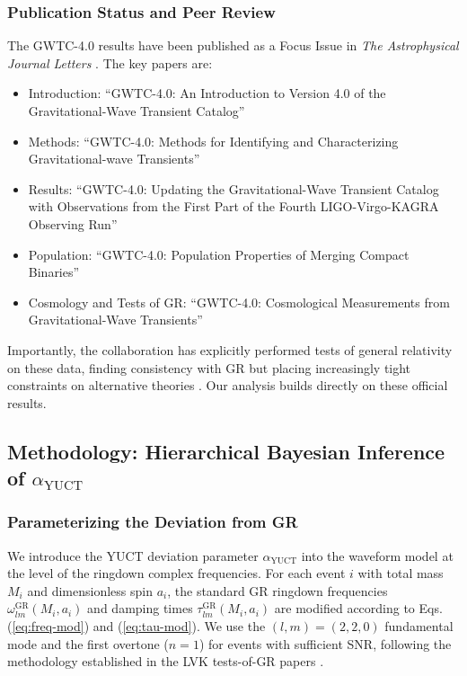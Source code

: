 \documentclass[12pt,a4paper]{article}
\theoremstyle{remark}
\begin{document}
	\subsubsection{Publication Status and Peer Review}
	
	The GWTC-4.0 results have been published as a Focus Issue in \textit{The Astrophysical Journal Letters} . The key papers are:
	
	\begin{itemize}
		\item Introduction: ``GWTC-4.0: An Introduction to Version 4.0 of the Gravitational-Wave Transient Catalog'' 
		\item Methods: ``GWTC-4.0: Methods for Identifying and Characterizing Gravitational-wave Transients'' 
		\item Results: ``GWTC-4.0: Updating the Gravitational-Wave Transient Catalog with Observations from the First Part of the Fourth LIGO-Virgo-KAGRA Observing Run'' 
		\item Population: ``GWTC-4.0: Population Properties of Merging Compact Binaries'' 
		\item Cosmology and Tests of GR: ``GWTC-4.0: Cosmological Measurements from Gravitational-Wave Transients'' 
	\end{itemize}
	
	Importantly, the collaboration has explicitly performed tests of general relativity on these data, finding consistency with GR but placing increasingly tight constraints on alternative theories . Our analysis builds directly on these official results.
	
	\subsection{Methodology: Hierarchical Bayesian Inference of $\alpha_{\text{YUCT}}$}
	
	\subsubsection{Parameterizing the Deviation from GR}
	
	We introduce the YUCT deviation parameter $\alpha_{\text{YUCT}}$ into the waveform model at the level of the ringdown complex frequencies. For each event $i$ with total mass $M_i$ and dimensionless spin $a_i$, the standard GR ringdown frequencies $\omega_{lm}^{\text{GR}}(M_i, a_i)$ and damping times $\tau_{lm}^{\text{GR}}(M_i, a_i)$ are modified according to Eqs. (\ref{eq:freq-mod}) and (\ref{eq:tau-mod}). We use the $(l,m) = (2,2,0)$ fundamental mode and the first overtone ($n=1$) for events with sufficient SNR, following the methodology established in the LVK tests-of-GR papers .
	
\end{document}
